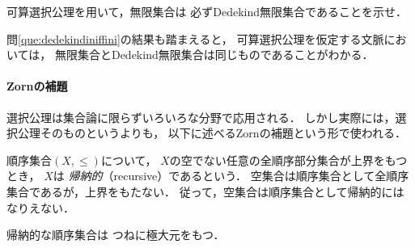   \begin{que} \label{que:dedeinf}
    可算選択公理を用いて，無限集合は
    必ずDedekind無限集合であることを示せ．
  \end{que}

  問\ref{que:dedekindiniffini}の結果も踏まえると，
  可算選択公理を仮定する文脈においては，
  無限集合とDedekind無限集合は同じものであることがわかる．




 \paragraph{Zornの補題}
  選択公理は集合論に限らずいろいろな分野で応用される．
  しかし実際には，選択公理そのものというよりも，
  以下に述べるZornの補題という形で使われる．

  順序集合$(X , {\leq})$について，
  $X$の空でない任意の全順序部分集合が上界をもつとき，
  $X$は
  \emph{帰納的}（recursive）であるという．
  空集合は順序集合として全順序集合であるが，上界をもたない．
  従って，空集合は順序集合として帰納的にはなりえない．

  \begin{thm}[Zornの補題] \label{thm:Zorn}
    帰納的な順序集合は
    つねに極大元をもつ．
  \end{thm}

